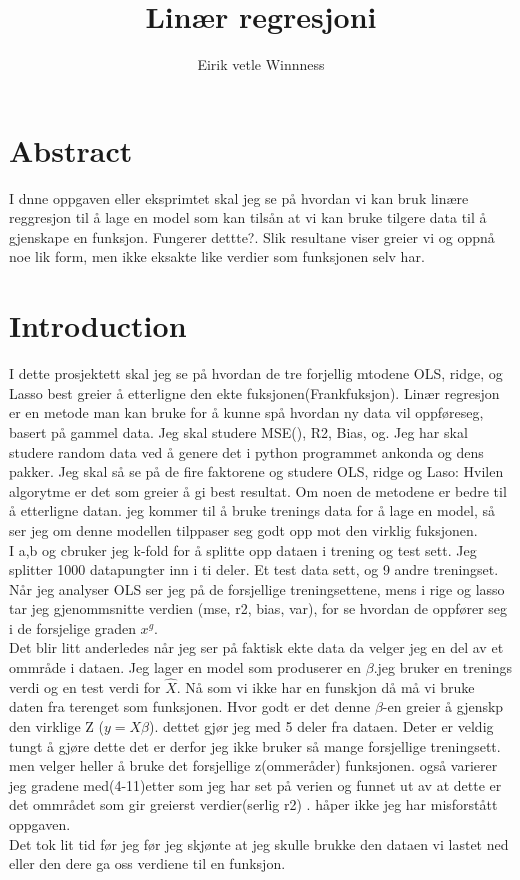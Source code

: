 \documentclass[norsk,a4paper,12pt]{article}
\begin{document}
\title{Linær regresjoni}
\author{Eirik vetle Winnness}
\maketitle 

\section*{Abstract}
I dnne oppgaven eller eksprimtet skal jeg se på hvordan vi kan bruk linære reggresjon til å lage en model som kan tilsån at vi kan bruke tilgere data til å gjenskape en funksjon. Fungerer dettte?. Slik resultane viser greier vi og oppnå noe lik form, men ikke eksakte like verdier som funksjonen selv har. 
\section*{Introduction}
I dette prosjektett skal jeg se på hvordan de tre forjellig mtodene OLS, ridge, og Lasso best greier å etterligne den ekte fuksjonen(Frankfuksjon). Linær regresjon er en metode man kan bruke for å kunne spå hvordan ny data vil oppføreseg, basert på gammel data. Jeg skal studere MSE(), R2, Bias, og. Jeg har skal studere random data ved å genere det i python programmet ankonda og dens pakker. Jeg skal så se på de fire faktorene og studere OLS, ridge og Laso: Hvilen algorytme er det som greier å gi best resultat. Om noen de metodene er bedre til å etterligne datan. jeg kommer til å bruke trenings data for å lage en model, så ser jeg om denne modellen tilppaser seg godt opp mot den virklig fuksjonen. 
\\
I a,b og cbruker jeg k-fold for å splitte opp dataen i trening og test sett. Jeg splitter 1000 datapungter inn i ti deler. Et test data sett, og 9 andre treningset. Når jeg analyser OLS ser jeg på de forsjellige treningsettene, mens i rige og lasso tar jeg gjenommsnitte verdien (mse, r2, bias, var), for se hvordan de oppfører seg i de forsjelige graden $x^g$.
\\
Det blir litt anderledes når jeg ser på faktisk ekte data da velger jeg en del av et ommråde i dataen. Jeg lager en model som produserer en   $\beta$.jeg bruker en trenings verdi og en test verdi for $\hat{X}$. Nå som vi ikke har en funskjon då må vi bruke daten fra terenget som funksjonen. Hvor godt er det denne $\beta$-en greier å gjenskp den virklige Z ($y = X\beta$). dettet gjør jeg med 5 deler fra dataen. Deter er veldig tungt å gjøre dette det er derfor jeg ikke bruker så mange forsjellige treningsett. men velger heller å bruke det forsjellige z(ommeråder) funksjonen. også varierer jeg gradene med(4-11)etter som jeg har set på verien og funnet ut av at dette er det ommrådet som gir greierst verdier(serlig r2) . håper ikke jeg har misforstått oppgaven.
\\
Det tok lit tid før jeg før jeg skjønte at jeg skulle brukke den dataen vi lastet ned  eller den dere ga oss verdiene til en funksjon.
\end{document}
